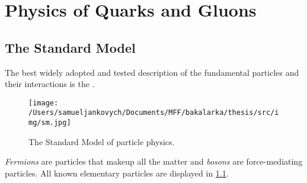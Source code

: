 \chapter{Physics of Quarks and Gluons}

\section{The Standard Model}
\label{sec:sm}
The best widely adopted and tested description of the fundamental particles and their interactions is the \SM \cite{pdg}. 
\begin{figure}[htb]
    \centering
    \texttt{[image: /Users/samueljankovych/Documents/MFF/bakalarka/thesis/src/img/sm.jpg]}
    \caption[The Standard Model of particle physics.]{The Standard Model of particle physics. \footnotemark}
    \label{fig:sm}
\end{figure}
\emph{Fermions} are particles that makeup all the matter and \emph{bosons} are force-mediating particles.
All known elementary particles are displayed in \cref{fig:sm}.

